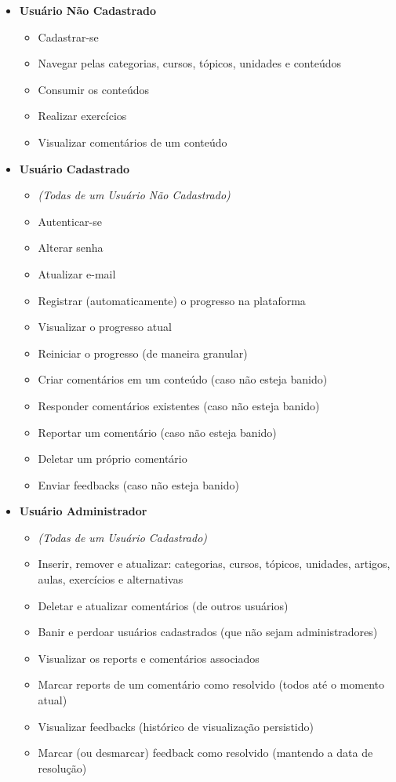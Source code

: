 \begin{itemize}
  \item \textbf{Usuário Não Cadastrado}
        \begin{itemize}
          \item Cadastrar-se
          \item Navegar pelas categorias, cursos, tópicos, unidades e conteúdos
          \item Consumir os conteúdos
          \item Realizar exercícios
          \item Visualizar comentários de um conteúdo
        \end{itemize}
  \item \textbf{Usuário Cadastrado}
        \begin{itemize}
          \item \textit{(Todas de um Usuário Não Cadastrado)}
          \item Autenticar-se
          \item Alterar senha
          \item Atualizar e-mail
          \item Registrar (automaticamente) o progresso na plataforma
          \item Visualizar o progresso atual
          \item Reiniciar o progresso (de maneira granular)
          \item Criar comentários em um conteúdo (caso não esteja banido)
          \item Responder comentários existentes (caso não esteja banido)
          \item Reportar um comentário (caso não esteja banido)
          \item Deletar um próprio comentário
          \item Enviar feedbacks (caso não esteja banido)
        \end{itemize}
  \item \textbf{Usuário Administrador}
        \begin{itemize}
          \item \textit{(Todas de um Usuário Cadastrado)}
          \item Inserir, remover e atualizar: categorias, cursos, tópicos, unidades, artigos,
                aulas, exercícios e alternativas
          \item Deletar e atualizar comentários (de outros usuários)
          \item Banir e perdoar usuários cadastrados (que não sejam administradores)
          \item Visualizar os reports e comentários associados
          \item Marcar reports de um comentário como resolvido (todos até o momento atual)
          \item Visualizar feedbacks (histórico de visualização persistido)
          \item Marcar (ou desmarcar) feedback como resolvido (mantendo a data de resolução)
        \end{itemize}
\end{itemize}

